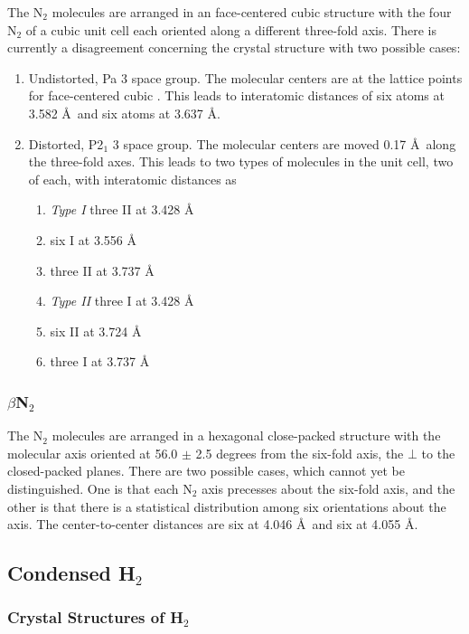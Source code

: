 The N$_2$ molecules are arranged in an face-centered cubic structure with 
the four N$_2$ of a cubic unit cell each oriented
along a different three-fold axis.  There is currently a disagreement 
concerning the crystal structure
with two possible cases:

\begin{enumerate}
\item  Undistorted, Pa 3 space group.  The molecular 
centers are at the lattice points for face-centered cubic . This leads to 
interatomic distances of six atoms at 3.582 \AA\ and six atoms at 
3.637 \AA.

\item Distorted, P2$_1$ 3 space group.  The molecular centers
are moved 0.17 \AA\ along the three-fold axes.  This leads to two types of 
molecules in the unit cell, two of each, with interatomic distances as
\begin{enumerate}
\item \emph{Type I} three II at 3.428 \AA
\item six I at 3.556 \AA
\item three II at 3.737 \AA
\item \emph{Type II} three I at 3.428 \AA
\item six II at 3.724 \AA
\item three I at 3.737 \AA
\end{enumerate}

\end{enumerate}

\subsubsection{$\beta$N$_2$}

The N$_2$ molecules are arranged in a hexagonal close-packed structure with 
the molecular axis oriented at 56.0 $\pm$ 2.5 degrees from the
six-fold axis, the $\bot$ to the closed-packed planes.  There are two possible 
cases, which cannot yet be
distinguished.  One is that each N$_2$ axis precesses about the six-fold 
axis, and the other is that there is a statistical distribution among
six orientations about the axis.  The center-to-center distances are 
six at 4.046 \AA\ and six at 4.055 \AA.

\subsection{Condensed H$_2$}

\subsubsection{Crystal Structures of H$_2$}

